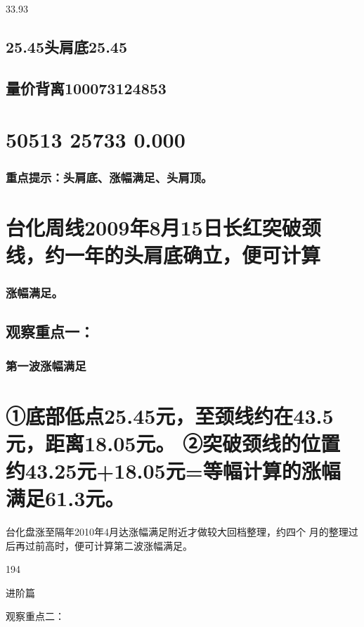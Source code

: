\documentclass{article}
\begin{document}
33.93

\subsection{25.45头肩底25.45}

\subsection{量价背离100073124853}

\section{50513 25733 0.000}

\subsubsection{重点提示：头肩底、涨幅满足、头肩顶。}

\section{台化周线2009年8月15日长红突破颈线，约一年的头肩底确立，便可计算}

\subsubsection{涨幅满足。}

\subsection{观察重点一：}

\subsubsection{第一波涨幅满足}

\section{①底部低点25.45元，至颈线约在43.5元，距离18.05元。 ②突破颈线的位置约43.25元+18.05元=等幅计算的涨幅满足61.3元。}

台化盘涨至隔年2010年4月达涨幅满足附近才做较大回档整理，约四个 月的整理过后再过前高时，便可计算第二波涨幅满足。

194

\clearpage

进阶篇

观察重点二：
\end{document}
